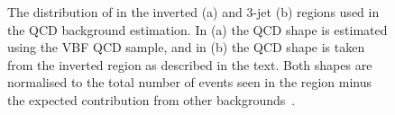 \begin{figure}
  \caption{The distribution of \METsig in the inverted (a) and 3-jet (b) regions used in the \ac{QCD} background estimation. In (a) the \ac{QCD} shape is estimated using the \ac{VBF} \ac{QCD} sample, and in (b) the \ac{QCD} shape is taken from the inverted region as described in the text. Both shapes are normalised to the total number of events seen in the region minus the expected contribution from other backgrounds~\cite{CMS-PAS-HIG-14-038}.}
  \label{fig:parkeddataqcd}
\end{figure}

